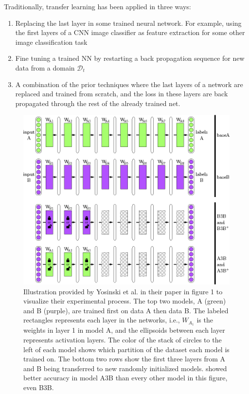 Traditionally, transfer learning has been applied in three ways: 
\begin{enumerate}  
    \item Replacing the last layer in some trained neural network. For example, using the first layers of a CNN image classifier as feature extraction for some other image classification task 
    \item Fine tuning a trained NN by restarting a back propagation sequence for new data from a domain \(\mathcal{D}_{t}\)
    \item A combination of the prior techniques where the last layers of a network are replaced and trained from scratch, and the loss in these layers are back propagated through the rest of the already trained net.
\end{enumerate}


\begin{figure}[ht] 
    \centering
    \includegraphics[width=\linewidth]{Chapters/2.Background/figures/transfer_experiment.png}
    \caption[Transfer learning experiment]{Illustration provided by Yosinski et al. in their paper\cite{yosinski2014transferable} in figure 1 to visualize their experimental process. The top two models, A (green) and B (purple), are trained first on data A then data B. The labeled rectangles represents each layer in the networks, i.e., \(W_{A_{1}}\) is the weights in layer 1 in model A, and the ellipsoids between each layer represents activation layers. The color of the stack of circles to the left of each model shows which partition of the dataset each model is trained on. The bottom two rows show the first three layers from A and B being transferred to new randomly initialized models. \cite{yosinski2014transferable} showed better accuracy in model A3B than every other model in this figure, even B3B.}
    \label{fig:transferexperiment}
\end{figure}

